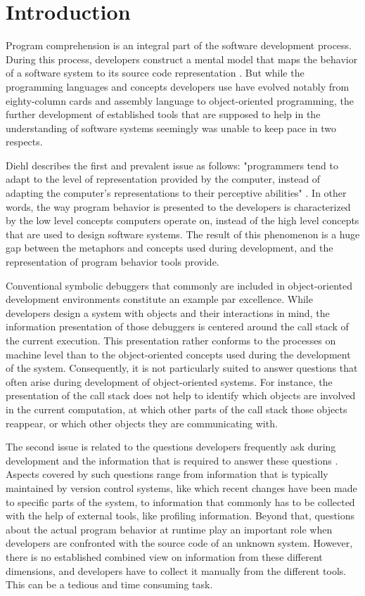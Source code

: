 \chapter{Introduction}
\label{c:introduction}

Program comprehension is an integral part of the software development process.
During this process, developers construct a mental model that maps the behavior of a software system to its source code representation \cite{latoza_maintaining_2006}.
But while the programming languages and concepts developers use have evolved notably from eighty-column cards and assembly language to object-oriented programming, the further development of established tools that are supposed to help in the understanding of software systems seemingly was unable to keep pace in two respects.

Diehl describes the first and prevalent issue as follows: "programmers tend to adapt to the level of representation provided by the computer, instead of adapting the computer's representations to their perceptive abilities" \cite{diehl_software_2007}.
In other words, the way program behavior is presented to the developers is characterized by the low level concepts computers operate on, instead of the high level concepts that are used to design software systems.
The result of this phenomenon is a huge gap between the metaphors and concepts used during development, and the representation of program behavior tools provide.

Conventional symbolic debuggers that commonly are included in object-oriented development environments constitute an example par excellence.
While developers design a system with objects and their interactions in mind, the information presentation of those debuggers is centered around the call stack of the current execution.
This presentation rather conforms to the processes on machine level than to the object-oriented concepts used during the development of the system.
Consequently, it is not particularly suited to answer questions that often arise during development of object-oriented systems.
For instance, the presentation of the call stack does not help to identify which objects are involved in the current computation, at which other parts of the call stack those objects reappear, or which other objects they are communicating with.

The second issue is related to the questions developers frequently ask during development and the information that is required to answer these questions \cite{sillito_asking_2008, latoza_hard--answer_2010, abi-antoun_questions_2010}.
Aspects covered by such questions range from information that is typically maintained by version control systems, like which recent changes have been made to specific parts of the system, to information that commonly has to be collected with the help of external tools, like profiling information.
Beyond that, questions about the actual program behavior at runtime play an important role when developers are confronted with the source code of an unknown system.
However, there is no established combined view on information from these different dimensions, and developers have to collect it manually from the different tools.
This can be a tedious and time consuming task.

